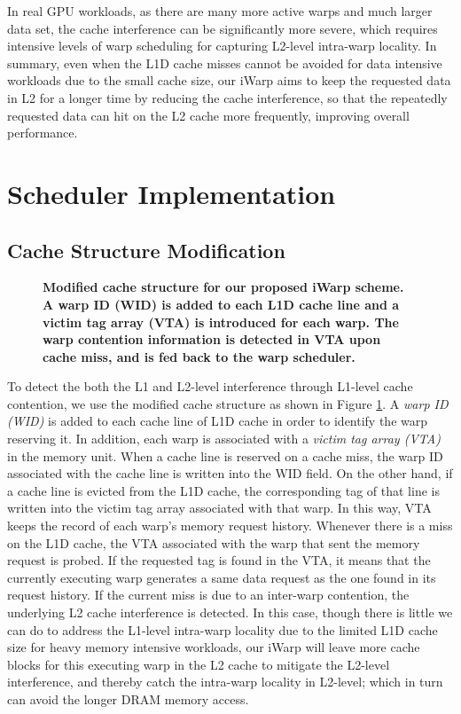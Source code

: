 \documentclass{sigplanconf}
\begin{document}
In real GPU workloads, as there are many more active warps and much larger data set, the cache interference can be significantly more severe, which requires intensive levels of warp scheduling for capturing L2-level intra-warp locality. In summary, even when the L1D cache misses cannot be avoided for data intensive workloads due to the small cache size, our iWarp aims to keep the requested data in L2 for a longer time by reducing the cache interference, so that the repeatedly requested data can hit on the L2 cache more frequently, improving overall performance.

\section{Scheduler Implementation}

\subsection{Cache Structure Modification}
\label{sec:arch}

\begin{figure}
\begin{center}
\end{center}
\vspace{-10pt}
\caption{\textbf{Modified cache structure for our proposed iWarp scheme. A warp ID (WID) is added to each L1D cache line and a victim tag array (VTA) is introduced for each warp. The warp contention information is detected in VTA upon cache miss, and is fed back to the warp scheduler. \label{fig:vta}}}
\vspace{-15pt}
\end{figure}

To detect the both the L1 and L2-level interference through L1-level cache contention, we use the modified cache structure as shown in Figure \ref{fig:vta}. A \emph{warp ID (WID)} is added to each cache line of L1D cache in order to identify the warp reserving it. In addition, each warp is associated with a \emph{victim tag array (VTA)} in the memory unit. When a cache line is reserved on a cache miss, the warp ID associated with the cache line is written into the WID field. On the other hand, if a cache line is evicted from the L1D cache, the corresponding tag of that line is written into the victim tag array associated with that warp. In this way, VTA keeps the record of each warp's memory request history. Whenever there is a miss on the L1D cache, the VTA associated with the warp that sent the memory request is probed. If the requested tag is found in the VTA, it means that the currently executing warp generates a same data request as the one found in its request history. If the current miss is due to an inter-warp contention, the underlying L2 cache interference is detected. In this case, though there is little we can do to address the L1-level intra-warp locality due to the limited L1D cache size for heavy memory intensive workloads, our iWarp will leave more cache blocks for this executing warp in the L2 cache to mitigate the L2-level interference, and thereby catch the intra-warp locality in L2-level; which in turn can avoid the longer DRAM memory access.
\end{document}
